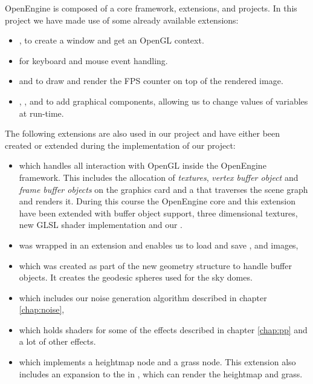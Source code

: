 OpenEngine is composed of a core framework, extensions, and
projects. In this project we have made use of some already available
extensions:

\begin{itemize}
  \item {}, to create a window and get an OpenGL context.
  \item {} for keyboard and mouse event handling.
  \item {} and  to draw and render the FPS
    counter on top of the rendered image.
  \item {}, , and
     to add graphical components, allowing us to
    change values of variables at run-time.
\end{itemize}

The following extensions are also used in our project and have either
been created or extended during the implementation of our project:

\begin{itemize}
  \item {} which handles all interaction with
    OpenGL inside the OpenEngine framework. This includes the
    allocation of \emph{textures}, \emph{vertex buffer object} and
    \emph{frame buffer objects} on the graphics card and a
     that traverses the scene graph and renders
    it. During this course the OpenEngine core and this extension have
    been extended with buffer object support, three dimensional
    textures, new GLSL shader implementation and our
    .
  \item {} was wrapped in an extension and enables us to
    load and save ,  and  images,
  \item {} which was created as part of the new geometry
    structure to handle  buffer objects. It creates the geodesic
    spheres used for the sky domes.
  \item {} which includes our noise generation algorithm
    described in chapter \ref{chap:noise},
  \item {} which holds shaders for
    some of the effects described in chapter \ref{chap:pp} and a lot
    of other effects.
  \item {} which implements a heightmap node and a grass
    node. This extension also includes an expansion to the
     in , which can render the
    heightmap and grass.
\end{itemize}

